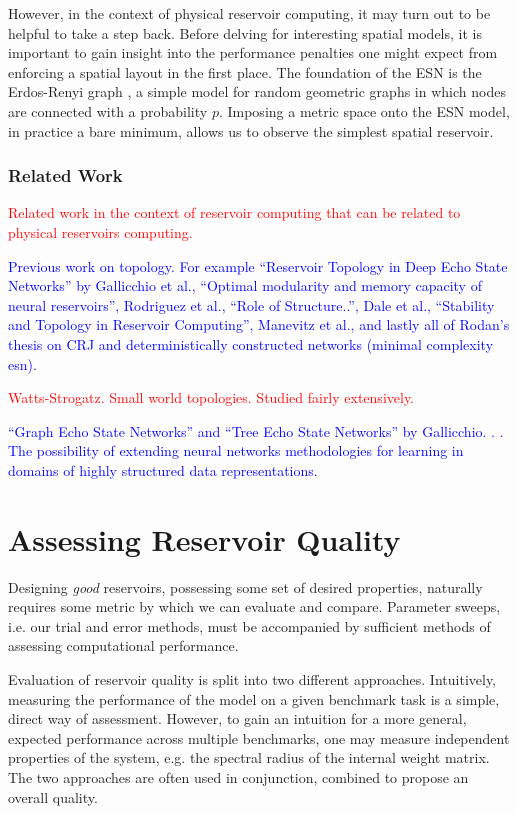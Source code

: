 However, in the context of physical reservoir computing, it may turn out to be
helpful to take a step back. Before delving for interesting spatial models, it
is important to gain insight into the performance penalties one might expect
from enforcing a spatial layout in the first place. The foundation of the ESN is
the Erdos-Renyi graph \cite{erdos_random_1959}, a simple model for random
geometric graphs in which nodes are connected with a probability $p$. Imposing a
metric space onto the ESN model, in practice a bare minimum, allows us to
observe the simplest spatial reservoir.

\subsubsection{Related Work}

\textcolor{red}{
  Related work in the context of reservoir computing that can be related to
physical reservoirs computing.
}

\textcolor{blue}{
  Previous work on topology. For example ``Reservoir Topology in Deep Echo State
Networks'' by Gallicchio et al., ``Optimal modularity and memory capacity of
neural reservoirs'', Rodriguez et al., ``Role of Structure..'', Dale et al.,
``Stability and Topology in Reservoir Computing'', Manevitz et al., and lastly
all of Rodan's thesis on CRJ and deterministically constructed networks (minimal
complexity esn).
}

\textcolor{red}{
  Watts-Strogatz. Small world topologies. Studied fairly extensively.
}

\textcolor{blue}{
  ``Graph Echo State Networks'' and ``Tree Echo State Networks'' by
Gallicchio. \cite{gallicchio_tree_2013}. \cite{gallicchio_graph_2010}. The
possibility of extending neural networks methodologies for learning in domains
of highly structured data representations.
}

\section{Assessing Reservoir Quality}

Designing \textit{good} reservoirs, possessing some set of desired properties,
naturally requires some metric by which we can evaluate and compare. Parameter
sweeps, i.e. our trial and error methods, must be accompanied by sufficient
methods of assessing computational performance.

Evaluation of reservoir quality is split into two different
approaches. Intuitively, measuring the performance of the model on a given
benchmark task is a simple, direct way of assessment. However, to gain an
intuition for a more general, expected performance across multiple benchmarks,
one may measure independent properties of the system, e.g. the spectral radius
of the internal weight matrix. The two approaches are often used in conjunction,
combined to propose an overall quality.


